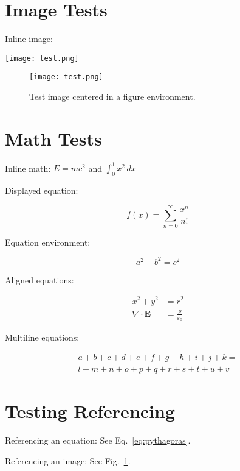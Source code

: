 \documentclass{article}
\begin{document}
\section{Image Tests}

Inline image:

\texttt{[image: test.png]}

\begin{figure}[h]
    \centering
    \texttt{[image: test.png]}
    \caption{Test image centered in a figure environment.}
    \label{fig:test_image}
\end{figure}

\newpage

\section{Math Tests}

Inline math: $E=mc^2$ and $\int_0^1 x^2 \,dx$

Displayed equation:

\[
    f(x) = \sum_{n=0}^{\infty} \frac{x^n}{n!}
\]

Equation environment:

\begin{equation}
    a^2 + b^2 = c^2
    \label{eq:pythagoras}
\end{equation}

Aligned equations:

\begin{align}
    x^2 + y^2 &= r^2 \\
    \nabla \cdot \mathbf{E} &= \frac{\rho}{\varepsilon_0}
\end{align}

Multiline equations:

\begin{multline}
    a + b + c + d + e + f + g + h + i + j + k = \\
    l + m + n + o + p + q + r + s + t + u + v
\end{multline}

\newpage

\section{Testing Referencing}

Referencing an equation: See Eq.~\ref{eq:pythagoras}.

Referencing an image: See Fig.~\ref{fig:test_image}.
\end{document}
